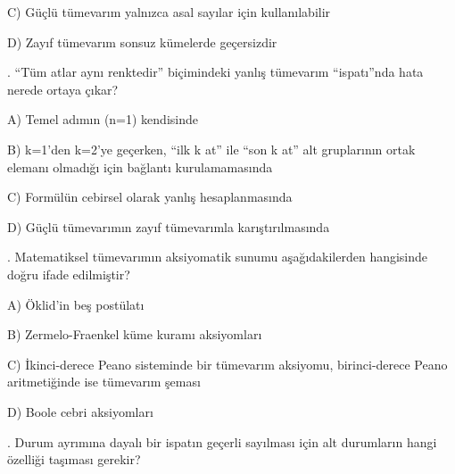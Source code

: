 \par\noindent\hspace*{1.6em}C) Güçlü tümevarım yalnızca asal sayılar için kullanılabilir

\par\noindent\hspace*{1.6em}D) Zayıf tümevarım sonsuz kümelerde geçersizdir

\par\smallskip{}. “Tüm atlar aynı renktedir” biçimindeki yanlış tümevarım “ispatı”nda hata nerede ortaya çıkar?

\par\noindent\hspace*{1.6em}A) Temel adımın (n=1) kendisinde

\par\noindent\hspace*{1.6em}B) k=1’den k=2’ye geçerken, “ilk k at” ile “son k at” alt gruplarının ortak elemanı olmadığı için bağlantı kurulamamasında

\par\noindent\hspace*{1.6em}C) Formülün cebirsel olarak yanlış hesaplanmasında

\par\noindent\hspace*{1.6em}D) Güçlü tümevarımın zayıf tümevarımla karıştırılmasında

\par\smallskip{}. Matematiksel tümevarımın aksiyomatik sunumu aşağıdakilerden hangisinde doğru ifade edilmiştir?

\par\noindent\hspace*{1.6em}A) Öklid’in beş postülatı

\par\noindent\hspace*{1.6em}B) Zermelo-Fraenkel küme kuramı aksiyomları

\par\noindent\hspace*{1.6em}C) İkinci-derece Peano sisteminde bir tümevarım aksiyomu, birinci-derece Peano aritmetiğinde ise tümevarım şeması

\par\noindent\hspace*{1.6em}D) Boole cebri aksiyomları

\par\smallskip{}. Durum ayrımına dayalı bir ispatın geçerli sayılması için alt durumların hangi özelliği taşıması gerekir?

